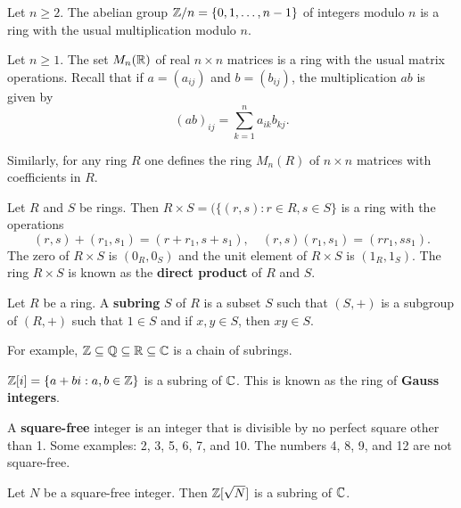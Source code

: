 \begin{example}
    Let $n\geq2$. 
    The abelian group $\mathbb{Z}/n=\{0,1,\dots,n-1\}$ of integers modulo $n$ is a ring 
    with the usual multiplication modulo $n$. 
\end{example}

\begin{example}
    Let $n\geq1$. 
    The set $M_n(\mathbb{R})$ of real $n\times n$ matrices is a ring with the usual matrix operations. Recall
    that if $a=(a_{ij})$ and $b=(b_{ij})$, the multiplication $ab$ is given by
    \[
    (ab)_{ij}=\sum_{k=1}^n a_{ik}b_{kj}.
    \]
\end{example}

Similarly, for any ring $R$ one defines the ring $M_n(R)$ of $n\times n$ matrices
with coefficients in $R$. 

\begin{example}
    Let $R$ and $S$ be rings. Then 
    $R\times S=(\{(r,s):r\in R,s\in S\}$ 
    is a ring with the operations 
    \[
    (r,s)+(r_1,s_1)=(r+r_1,s+s_1),\quad 
    (r,s)(r_1,s_1)=(rr_1,ss_1).
    \]
    The zero of $R\times S$ is $(0_R,0_S)$ and 
    the unit element of $R\times S$ is $(1_R,1_S)$. The ring 
    $R\times S$ is known as the \textbf{direct product} of $R$ and $S$. 
\end{example}

\begin{definition}
    Let $R$ be a ring. A \textbf{subring} $S$ of $R$ is a subset $S$ such that
    $(S,+)$ is a subgroup of $(R,+)$ such that $1\in S$ and 
    if $x,y\in S$, then $xy\in S$. 
\end{definition}

For example, $\mathbb{Z}\subseteq\mathbb{Q}\subseteq\mathbb{R}\subseteq\mathbb{C}$ is a chain of subrings. 

\begin{example}
    $\mathbb{Z}[i]=\{a+bi:a,b\in\mathbb{Z}\}$ is a subring of $\mathbb{C}$. 
    This is known as the ring of \textbf{Gauss integers}.  
\end{example}

A \textbf{square-free} integer is an integer that is divisible by 
no perfect square other than 1. Some examples: 2, 3, 5, 6, 7, and 10. 
The numbers 4, 8, 9, and 12 are not square-free. 

\begin{example}
	Let $N$ be a square-free integer. Then $\mathbb{Z}[\sqrt{N}]$ is
	a subring of $\mathbb{C}$.  	
\end{example}


